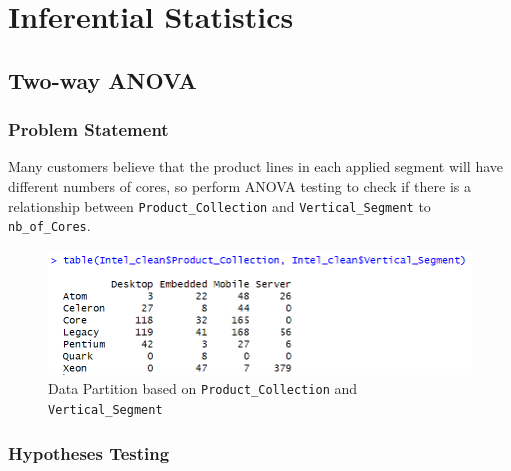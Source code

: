 \chapter{Inferential Statistics}

\section{Two-way ANOVA}
\subsection{Problem Statement}

Many customers believe that the product lines in each applied segment will have different numbers of cores, so perform ANOVA testing to check if there is a relationship between \texttt{Product\_Collection} and \texttt{Vertical\_Segment} to \texttt{nb\_of\_Cores}.

\begin{figure}[ht]
  \centering
  \includegraphics[width=14cm]{img/1.png}
  \caption{Data Partition based on \texttt{Product\_Collection} and \texttt{Vertical\_Segment}}
\end{figure}

\subsection{Hypotheses Testing}

\begin{lstlisting}[language=R]

  \end{lstlisting}


